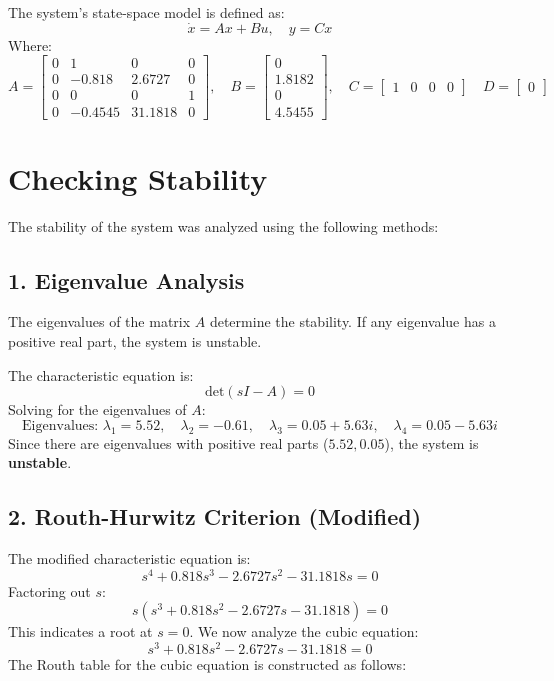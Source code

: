 \documentclass[a4paper,12pt]{article}
\begin{document}
The system's state-space model is defined as:
\[
\dot{x} = A x + B u, \quad y = C x
\]
Where:
\[
A = \begin{bmatrix}
0 & 1 & 0 & 0 \\
0 & -0.818 & 2.6727 & 0 \\
0 & 0 & 0 & 1 \\
0 & -0.4545 & 31.1818 & 0
\end{bmatrix}, \quad
B = \begin{bmatrix}
0 \\
1.8182 \\
0 \\
4.5455
\end{bmatrix}, \quad
C = \begin{bmatrix}
1 & 0 & 0 & 0
\end{bmatrix}\quad
D = \begin{bmatrix}
0
\end{bmatrix}

\]

\section*{Checking Stability}
The stability of the system was analyzed using the following methods:

\subsection*{1. Eigenvalue Analysis}
The eigenvalues of the matrix \( A \) determine the stability. If any eigenvalue has a positive real part, the system is unstable.

The characteristic equation is:
\[
\text{det}(sI - A) = 0
\]
Solving for the eigenvalues of \( A \):
\[
\text{Eigenvalues: } \lambda_1 = 5.52, \quad \lambda_2 = -0.61, \quad \lambda_3 = 0.05 + 5.63i, \quad \lambda_4 = 0.05 - 5.63i
\]
Since there are eigenvalues with positive real parts (\( 5.52, 0.05 \)), the system is \textbf{unstable}.

\subsection*{2. Routh-Hurwitz Criterion (Modified)}
The modified characteristic equation is:
\[
s^4 + 0.818 s^3 - 2.6727 s^2 - 31.1818 s = 0
\]
Factoring out $s$:
\[
s(s^3 + 0.818 s^2 - 2.6727 s - 31.1818) = 0
\]
This indicates a root at $s=0$. We now analyze the cubic equation:
\[
s^3 + 0.818 s^2 - 2.6727 s - 31.1818 = 0
\]
The Routh table for the cubic equation is constructed as follows:
\end{document}
